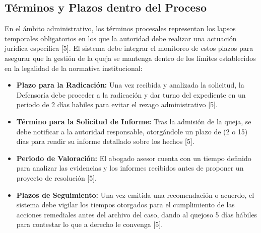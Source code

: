 \subsection{Términos y Plazos dentro del Proceso}
En el ámbito administrativo, los términos procesales representan los lapsos temporales obligatorios en los que la autoridad debe realizar una actuación jurídica especifica [5]. El sistema debe integrar el monitoreo de estos plazos para asegurar que la gestión de la queja se mantenga dentro de los límites establecidos en la legalidad de la normativa institucional:
\begin{itemize}
    \item \textbf{Plazo para la Radicación:} Una vez recibida y analizada la solicitud, la Defensoría debe proceder a la radicación y dar turno del expediente en un periodo de 2 días habiles para evitar el rezago administrativo [5].
    \item \textbf{Término para la Solicitud de Informe:} Tras la admisión de la queja, se debe notificar a la autoridad responsable, otorgándole un plazo de (2 o 15) días para rendir su informe detallado sobre los hechos [5].
    \item \textbf{Periodo de Valoración:}  El abogado asesor cuenta con un tiempo definido para analizar las evidencias y los informes recibidos antes de proponer un proyecto de resolución [5].
    \item \textbf{Plazos de Seguimiento:} Una vez emitida una recomendación o acuerdo, el sistema debe vigilar los tiempos otorgados para el cumplimiento de las acciones remediales antes del archivo del caso, dando al quejoso 5 días hábiles para contestar lo que a derecho le convenga [5].
\end{itemize}

